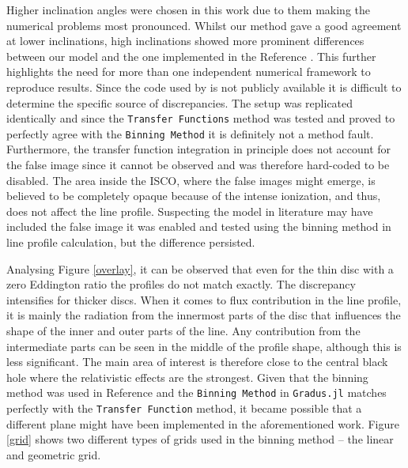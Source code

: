\documentclass[fleqn,usenatbib,useAMS]{mnras}
\begin{document}
Higher inclination angles were chosen in this work due to them making the numerical problems most pronounced. Whilst our method gave a good agreement at lower inclinations, high inclinations showed more prominent differences between our model and the one implemented in the Reference \cite{taylor2018exploring}. This further highlights the need for more than one independent numerical framework to reproduce results. Since the code used by \cite{taylor2018exploring} is not publicly available it is difficult to determine the specific source of discrepancies. The setup was replicated identically and since the {\tt Transfer Functions} method was tested and proved to perfectly agree with the {\tt Binning Method} it is definitely not a method fault. Furthermore, the transfer function integration in principle does not account for the false image since it cannot be observed and was therefore hard-coded to be disabled. The area inside the ISCO, where the false images might emerge, is believed to be completely opaque because of the intense ionization, and thus, does not affect the line profile. Suspecting the model in literature may have included the false image it was enabled and tested using the binning method in line profile calculation, but the difference persisted.

Analysing Figure \ref{overlay}, it can be observed that even for the thin disc with a zero Eddington ratio the profiles do not match exactly. The discrepancy intensifies for thicker discs. When it comes to flux contribution in the line profile, it is mainly the radiation from the innermost parts of the disc that influences the shape of the inner and outer parts of the line. Any contribution from the intermediate parts can be seen in the middle of the profile shape, although this is less significant. The main area of interest is therefore close to the central black hole where the relativistic effects are the strongest. Given that the binning method was used in Reference \cite{taylor2018exploring} and the {\tt Binning Method} in {\tt Gradus.jl} matches perfectly with the {\tt Transfer Function} method, it became possible that a different plane might have been implemented in the aforementioned work. Figure \ref{grid} shows two different types of grids used in the binning method -- the linear and geometric grid.
\end{document}
